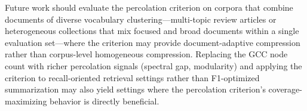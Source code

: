 \documentclass[11pt,letterpaper]{article}
\begin{document}
Future work should evaluate the percolation criterion on corpora that combine documents
of diverse vocabulary clustering---multi-topic review articles or heterogeneous
collections that mix focused and broad documents within a single evaluation set---where
the criterion may provide document-adaptive compression rather than corpus-level
homogeneous compression. Replacing the GCC node count with richer percolation signals
(spectral gap, modularity) and applying the criterion to recall-oriented retrieval
settings rather than F1-optimized summarization may also yield settings where the
percolation criterion's coverage-maximizing behavior is directly beneficial.



\end{document}
